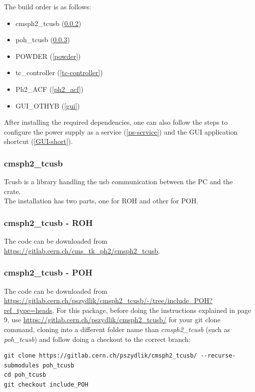 \documentclass[10pt,a4paper]{article}
\begin{document}
The build order is as follows:
\begin{itemize}
    \item cmsph2\_tcusb (\ref{roh_tcusb})
    \item poh\_tcusb (\ref{poh_tcusb})
    \item POWDER (\ref{powder})
    \item tc\_controller (\ref{tc-controller})
    \item Ph2\_ACF (\ref{ph2_acf})
    \item GUI\_OTHYB (\ref{gui})
\end{itemize}

After installing the required dependencies, one can also follow the steps to configure the power supply as a service (\ref{ps-service}) and the GUI application shortcut (\ref{GUI-short}).

\subsubsection{cmsph2\_tcusb}

Tcusb is a library handling the usb communication between the PC and the crate.  \\
The installation has two parts, one for ROH and other for POH.

\subsubsection{cmsph2\_tcusb - ROH} 
\label{roh_tcusb}

The code can be downloaded from \url{https://gitlab.cern.ch/cms_tk_ph2/cmsph2_tcusb}.

\subsubsection{cmsph2\_tcusb - POH} 
\label{poh_tcusb}

The code can be downloaded from \url{https://gitlab.cern.ch/pszydlik/cmsph2_tcusb/-/tree/include_POH?ref_type=heads}. For this package, before doing the instructions explained in page 9, use \url{https://gitlab.cern.ch/pszydlik/cmsph2_tcusb/} for your git clone command, cloning into a different folder name than \emph{cmsph2\_tcusb} (such as \emph{poh\_tcusb}) and follow doing a checkout to the correct branch: 

\begin{framed}
\begin{verbatim}
git clone https://gitlab.cern.ch/pszydlik/cmsph2_tcusb/ --recurse-submodules poh_tcusb
cd poh_tcusb
git checkout include_POH
\end{verbatim}
\end{framed}
\end{document}
